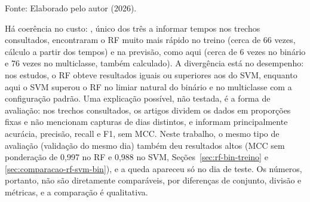 \documentclass[
    12pt,                %
    openright,           %
    oneside,             %
    a4paper,             %
    english,             %
    brazil               %
]{abntex2}
\begin{document}
\begin{table}
\centering
\caption{Comparação com os trabalhos correlatos}
\label{tab:correlatos}
\footnotesize
{}
\par\smallskip
Fonte: Elaborado pelo autor (2026).
\end{table}

Há coerência no custo: , único dos três a informar tempos nos trechos consultados, encontraram o RF muito mais rápido no treino (cerca de 66 vezes, cálculo a partir dos tempos) e na previsão, como aqui (cerca de 6 vezes no binário e 76 vezes no multiclasse, também calculado). A divergência está no desempenho: nos estudos, o RF obteve resultados iguais ou superiores aos do SVM, enquanto aqui o SVM superou o RF no limiar natural do binário e no multiclasse com a configuração padrão. Uma explicação possível, não testada, é a forma de avaliação: nos trechos consultados, os artigos dividem os dados em proporções fixas e não mencionam capturas de dias distintos, e informam principalmente acurácia, precisão, recall e F1, sem MCC. Neste trabalho, o mesmo tipo de avaliação (validação do mesmo dia) também deu resultados altos (MCC sem ponderação de 0,997 no RF e 0,988 no SVM, Seções~\ref{sec:rf-bin-treino} e \ref{sec:comparacao-rf-svm-bin}), e a queda apareceu só no dia de teste. Os números, portanto, não são diretamente comparáveis, por diferenças de conjunto, divisão e métricas, e a comparação é qualitativa.
\end{document}
